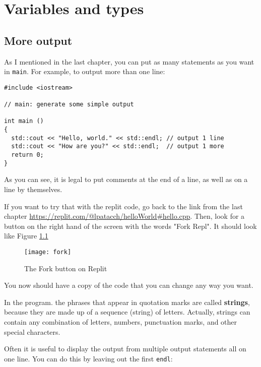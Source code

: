 

\chapter{Variables and types}

\section{More output}

As I mentioned in the last chapter, you can put as many statements as
you want in {\tt main}.  For example, to output more than one line:

\begin{mdframed}
\begin{verbatim}
#include <iostream>

// main: generate some simple output

int main ()
{
  std::cout << "Hello, world." << std::endl; // output 1 line
  std::cout << "How are you?" << std::endl;  // output 1 more
  return 0;
}
\end{verbatim}
%
\end{mdframed}

As you can see, it is legal to put comments at the
end of a line, as well as on a line by themselves.

If you want to try that with the replit code, go back to the link from the last chapter 
\url{https://replit.com/@lpatacch/helloWorld#hello.cpp}. Then, look for a button on the right hand of the screen with the words "Fork Repl". It should look like Figure \ref{fig:fork}
\begin{figure}
    \centering
    \texttt{[image: fork]}
    \caption{The Fork button on Replit}
    \label{fig:fork}
\end{figure}
You now should have a copy of the code that you can change any way you want.


In the program. the phrases that appear in quotation marks are called {\bf strings},
because they are made up of a sequence (string) of letters.  Actually,
strings can contain any combination of letters, numbers, punctuation
marks, and other special characters.


Often it is useful to display the output from multiple output
statements all on one line.  You can do this by leaving out
the first {\tt endl}:

